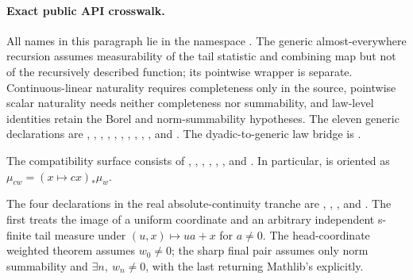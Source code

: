 \documentclass[11pt]{article}
\numberwithin{equation}{section}
\theoremstyle{definition}
\theoremstyle{remark}
\begin{document}
\paragraph{Exact public API crosswalk.}
All names in this paragraph lie in the namespace
.  The generic almost-everywhere recursion assumes
measurability of the tail statistic and combining map but not of the recursively described
function; its pointwise wrapper is separate.  Continuous-linear naturality requires
completeness only in the source, pointwise scalar naturality needs neither completeness nor
summability, and law-level identities retain the Borel and norm-summability hypotheses.
The eleven generic declarations are
,
,
,
,
,
,
,
,
,
, and
.
The dyadic-to-generic law bridge is
.

The compatibility surface consists of
,
,
,
,
,
, and
.  In particular,
 is oriented as
\(\mu_{cw}=(x\mapsto cx)_*\mu_w\).

The four declarations in the real absolute-continuity tranche are
,
,
, and
.  The first treats the image of a
uniform coordinate and an arbitrary independent s-finite tail measure under
\((u,x)\mapsto ua+x\) for \(a\ne0\).  The head-coordinate weighted theorem assumes
\(w_0\ne0\); the sharp final pair assumes only norm summability and
\(\exists n,\ w_n\ne0\), with the last returning Mathlib's
 explicitly.
\end{document}
